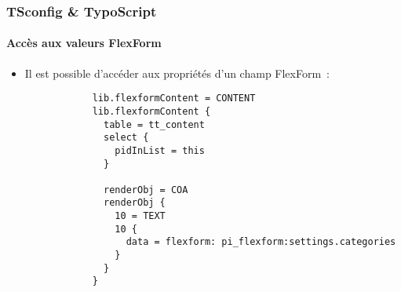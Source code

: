 \begin{frame}[fragile]
	\frametitle{TSconfig \& TypoScript}
	\framesubtitle{Accès aux valeurs FlexForm}

	\lstset{basicstyle=\tiny\ttfamily}

	\begin{itemize}

		\item Il est possible d'accéder aux propriétés d'un champ FlexForm~:

		\begin{lstlisting}
			lib.flexformContent = CONTENT
			lib.flexformContent {
			  table = tt_content
			  select {
			    pidInList = this
			  }

			  renderObj = COA
			  renderObj {
			    10 = TEXT
			    10 {
			      data = flexform: pi_flexform:settings.categories
			    }
			  }
			}
		\end{lstlisting}

	\end{itemize}

\end{frame}

